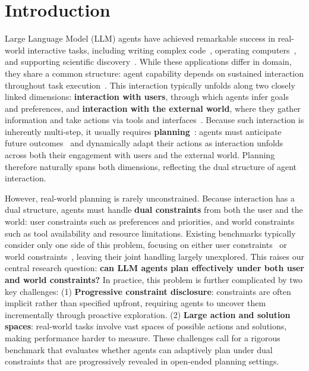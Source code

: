 \section{Introduction}
\label{sec:intro}




Large Language Model (LLM) agents have achieved remarkable success in real-world interactive tasks, including writing complex code~\citep{claudecode,code2math}, operating computers~\citep{UI-TARS,UI-TARS-2}, and supporting scientific discovery~\citep{DR-Tulu,Deep-Research-Agents}.
While these applications differ in domain, they share a common structure: agent capability depends on sustained interaction throughout task execution~\citep{ReAct,park2023generativeagentsinteractivesimulacra}.
This interaction typically unfolds along two closely linked dimensions: \textbf{interaction with users}, through which agents infer goals and preferences, and \textbf{interaction with the external world}, where they gather information and take actions via tools and interfaces~\citep{xi2023risepotentiallargelanguage,Wang_2024}.
Because such interaction is inherently multi-step, it usually requires \textbf{planning}~\citep{huang2024understandingplanningllmagents}: agents must anticipate future outcomes~\citep{current-agent-fail-wm-as-tool} and dynamically adapt their actions as interaction unfolds~\citep{costbench} across both their engagement with users and the external world.
Planning therefore naturally spans both dimensions, reflecting the dual structure of agent interaction. 

However, real-world planning is rarely unconstrained. Because interaction has a dual structure, agents must handle \textbf{dual constraints} from both the user and the world: user constraints such as preferences and priorities, and world constraints such as tool availability and resource limitations.
Existing benchmarks typically consider only one side of this problem, focusing on either user constraints~\citep{UserBench,opentom,URS-dataset} or world constraints~\citep{appworld,tau-2-bench,PlanBench}, leaving their joint handling largely unexplored.
This raises our central research question: \textbf{can LLM agents plan effectively under both user and world constraints?} 
In practice, this problem is further complicated by two key challenges:
(1) \textbf{Progressive constraint disclosure}: constraints are often implicit rather than specified upfront, requiring agents to uncover them incrementally through proactive exploration.
(2) \textbf{Large action and solution spaces}: real-world tasks involve vast spaces of possible actions and solutions, making performance harder to measure. %
These challenges call for a rigorous benchmark that evaluates whether agents can adaptively plan under dual constraints that are progressively revealed in open-ended planning settings.

